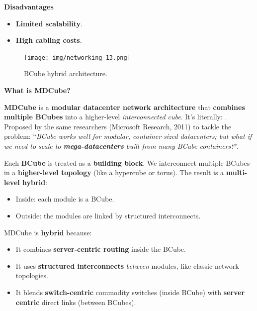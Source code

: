\highspace
\begin{flushleft}
    \textcolor{Red2}{ \textbf{Disadvantages}}
\end{flushleft}
\begin{itemize}
    \item \textbf{Limited scalability}.
    \item \textbf{High cabling costs}.
\end{itemize}

\begin{figure}[!htp]
    \centering
    \texttt{[image: img/networking-13.png]}
    \caption{BCube hybrid architecture.}
\end{figure}

\newpage

\begin{flushleft}
    \textcolor{Green3}{ \textbf{What is MDCube?}}
\end{flushleft}
\textbf{MDCube} is a \textbf{modular datacenter network architecture} that \textbf{combines multiple BCubes} into a higher-level \emph{interconnected cube}. It's literally: . Proposed by the same researchers (Microsoft Research, 2011) to tackle the problem: ``\emph{BCube works well for modular, container-sized datacenters; but what if we need to scale to \textbf{mega-datacenters} built from many BCube containers?}''.

\highspace
Each \textbf{BCube} is treated as a \textbf{building block}. We interconnect multiple BCubes in a \textbf{higher-level topology} (like a hypercube or torus). The result is a \textbf{multi-level hybrid}:
\begin{itemize}
    \item Inside: each module is a BCube.
    \item Outside: the modules are linked by structured interconnects.
\end{itemize}
MDCube is \textbf{hybrid} because:
\begin{itemize}
    \item It combines \textbf{server-centric routing} inside the BCube.
    \item It uses \textbf{structured interconnects} \emph{between} modules, like classic network topologies.
    \item It blends \textbf{switch-centric} commodity switches (inside BCube) with \textbf{server centric} direct links (between BCubes).
\end{itemize}

